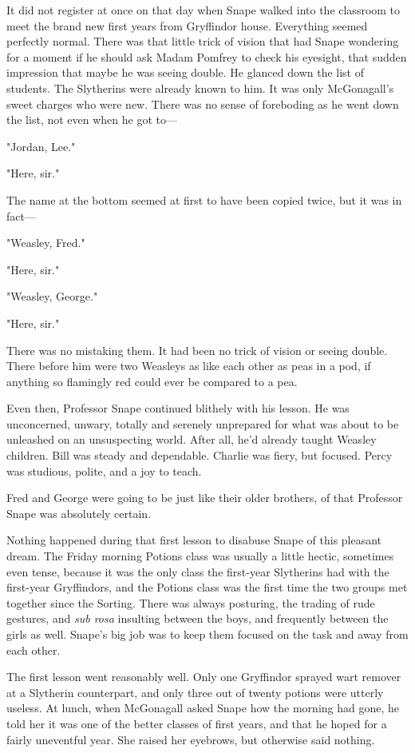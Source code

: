 It did not register at once on that day when Snape walked into the classroom to meet the brand new first years from Gryffindor house. Everything seemed perfectly normal. There was that little trick of vision that had Snape wondering for a moment if he should ask Madam Pomfrey to check his eyesight, that sudden impression that maybe he was seeing double. He glanced down the list of students. The Slytherins were already known to him. It was only McGonagall's sweet charges who were new. There was no sense of foreboding as he went down the list, not even when he got to—

"Jordan, Lee."

"Here, sir."

The name at the bottom seemed at first to have been copied twice, but it was in fact—

"Weasley, Fred."

"Here, sir."

"Weasley, George."

"Here, sir."

There was no mistaking them. It had been no trick of vision or seeing double. There before him were two Weasleys as like each other as peas in a pod, if anything so flamingly red could ever be compared to a pea.

Even then, Professor Snape continued blithely with his lesson. He was unconcerned, unwary, totally and serenely unprepared for what was about to be unleashed on an unsuspecting world. After all, he'd already taught Weasley children. Bill was steady and dependable. Charlie was fiery, but focused. Percy was studious, polite, and a joy to teach.

Fred and George were going to be just like their older brothers, of that Professor Snape was absolutely certain.

Nothing happened during that first lesson to disabuse Snape of this pleasant dream. The Friday morning Potions class was usually a little hectic, sometimes even tense, because it was the only class the first-year Slytherins had with the first-year Gryffindors, and the Potions class was the first time the two groups met together since the Sorting. There was always posturing, the trading of rude gestures, and \emph{sub rosa} insulting between the boys, and frequently between the girls as well. Snape's big job was to keep them focused on the task and away from each other.

The first lesson went reasonably well. Only one Gryffindor sprayed wart remover at a Slytherin counterpart, and only three out of twenty potions were utterly useless. At lunch, when McGonagall asked Snape how the morning had gone, he told her it was one of the better classes of first years, and that he hoped for a fairly uneventful year. She raised her eyebrows, but otherwise said nothing.

